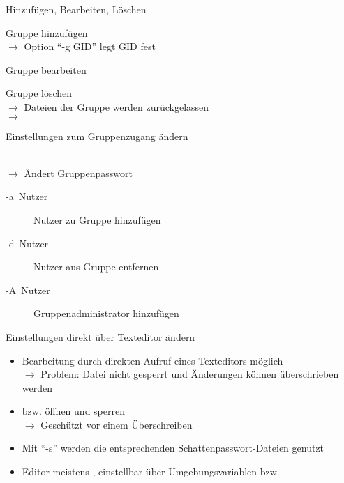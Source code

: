 \documentclass[aspectratio=43]{beamer}
\begin{document}
\begin{frame}{Hinzufügen, Bearbeiten, Löschen}
  \begin{block}{Gruppe hinzufügen}
    \\
    $\rightarrow$ Option ``-g GID'' legt GID fest 
  \end{block}
  \begin{block}{Gruppe bearbeiten}
  \end{block}
  \begin{block}{Gruppe löschen}
    \\
    $\rightarrow$ Dateien der Gruppe werden zurückgelassen\\
    $\rightarrow$ 
  \end{block}
\end{frame}
\begin{frame}{Einstellungen zum Gruppenzugang ändern}
  \begin{block}{}
    \\
    $\rightarrow$ Ändert Gruppenpasswort
    \begin{description}
      \item[-a~Nutzer] Nutzer zu Gruppe hinzufügen
      \item[-d~Nutzer] Nutzer aus Gruppe entfernen
      \item[-A~Nutzer] Gruppenadministrator hinzufügen
    \end{description}
  \end{block}
\end{frame}

\begin{frame}{Einstellungen direkt über Texteditor ändern}
  \begin{itemize}
    \item Bearbeitung durch direkten Aufruf eines Texteditors möglich\\
    $\rightarrow$ Problem: Datei nicht gesperrt und Änderungen können überschrieben werden
    \item {} bzw.  öffnen und sperren  \\
    $\rightarrow$ Geschützt vor einem Überschreiben
    \item Mit ``-s'' werden die entsprechenden Schattenpasswort-Dateien genutzt
    \item Editor meistens , einstellbar über Umgebungsvariablen  bzw. 
  \end{itemize}
\end{frame}
\end{document}

